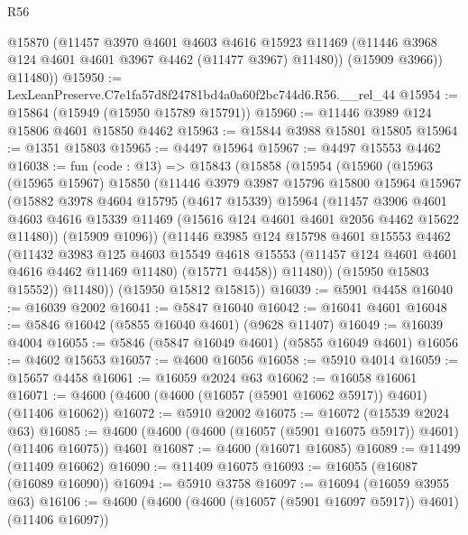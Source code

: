 \begin{lexlean}{R56}
\begin{coremodule}
          @15870
          (@11457
            @3970
            @4601
            @4603
            @4616
            @15923
            @11469
            (@11446 @3968 @124 @4601 @4601 @3967 @4462 (@11477 @3967) @11480))
          (@15909 @3966))
        @11480))
@15950 := LexLeanPreserve.C7e1fa57d8f24781bd4a0a60f2bc744d6.R56.__rel_44
@15954 := @15864 (@15949 (@15950 @15789 @15791))
@15960 := @11446 @3989 @124 @15806 @4601 @15850 @4462
@15963 := @15844 @3988 @15801 @15805
@15964 := @1351 @15803
@15965 := @4497 @15964
@15967 := @4497 @15553 @4462
@16038 := fun (code : @13) =>
  @15843
    (@15858
      (@15954
        (@15960
          (@15963
            (@15965 @15967)
            @15850
            (@11446
              @3979
              @3987
              @15796
              @15800
              @15964
              @15967
              (@15882
                @3978
                @4604
                @15795
                (@4617 @15339)
                @15964
                (@11457
                  @3906
                  @4601
                  @4603
                  @4616
                  @15339
                  @11469
                  (@15616 @124 @4601 @4601 @2056 @4462 @15622 @11480))
                (@15909 @1096))
              (@11446
                @3985
                @124
                @15798
                @4601
                @15553
                @4462
                (@11432
                  @3983
                  @125
                  @4603
                  @15549
                  @4618
                  @15553
                  (@11457 @124 @4601 @4601 @4616 @4462 @11469 @11480)
                  (@15771 @4458))
                @11480))
            (@15950 @15803 @15552))
          @11480))
      (@15950 @15812 @15815))
@16039 := @5901 @4458
@16040 := @16039 @2002
@16041 := @5847 @16040
@16042 := @16041 @4601
@16048 := @5846 @16042 (@5855 @16040 @4601) (@9628 @11407)
@16049 := @16039 @4004
@16055 := @5846 (@5847 @16049 @4601) (@5855 @16049 @4601)
@16056 := @4602 @15653
@16057 := @4600 @16056
@16058 := @5910 @4014
@16059 := @15657 @4458
@16061 := @16059 @2024 @63
@16062 := @16058 @16061
@16071 := @4600 (@4600 (@4600 (@16057 (@5901 @16062 @5917)) @4601) (@11406 @16062))
@16072 := @5910 @2002
@16075 := @16072 (@15539 @2024 @63)
@16085 := @4600 (@4600 (@4600 (@16057 (@5901 @16075 @5917)) @4601) (@11406 @16075)) @4601
@16087 := @4600 (@16071 @16085)
@16089 := @11499 (@11409 @16062)
@16090 := @11409 @16075
@16093 := @16055 (@16087 (@16089 @16090))
@16094 := @5910 @3758
@16097 := @16094 (@16059 @3955 @63)
@16106 := @4600 (@4600 (@4600 (@16057 (@5901 @16097 @5917)) @4601) (@11406 @16097))

\end{coremodule}
\end{lexlean}
